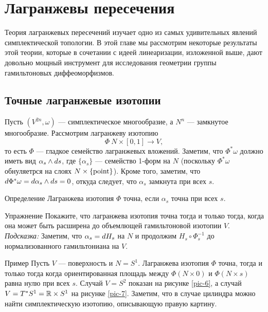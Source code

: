\chapter{Лагранжевы пересечения}\label{chap:6}

Теория лагранжевых пересечений изучает одно из самых удивительных явлений симплектической топологии.
В этой главе мы рассмотрим некоторые результаты этой теории, которые в сочетании с идеей линеаризации, изложенной выше, дают довольно мощный инструмент для исследования геометрии группы гамильтоновых диффеоморфизмов.

\section{Точные лагранжевые изотопии}
Пусть $(V^{2n}, \omega)$ --- симплектическое многообразие, а $N^n$ ---
замкнутое многообразие. 
Рассмотрим лагранжеву изотопию
\[\Phi\: N \times [0, 1] \to V,\]
то есть $\Phi$ --- гладкое семейство лагранжевых вложений.
Заметим, что $\Phi^\ast \omega$ должно иметь вид $\alpha_s \wedge d
s$, где $\{\alpha_s\}$ --- семейство 1-форм на $N$ (поскольку
$\Phi^\ast \omega$ обнуляетрся на слоях $N \times \{\mathrm{point}\}$). 
Кроме того, заметим, что $d \Phi^\ast \omega = d \alpha_s \wedge d
s = 0$, откуда следует, что $\alpha_s$ замкнута при всех $s$. 

\begin{ex*}{Определение}
Лагранжева изотопия $\Phi$ точна, если $\alpha_s$ точна при всех $s$.
\end{ex*}

\begin{ex}{Упражнение}\label{6.1.A}
Покажите, что лагранжева изотопия точна тогда и только тогда, когда
она может быть расширена до объемлющей гамильтоновой изотопии $V$. 
\emph{Подсказка:} Заметим, что $\alpha_s \z= \d  H_s$ на $N$ и продолжим $H_s
\circ \Phi^{-1}_s$ до нормализованного гамильтониана на $V$. 
\end{ex}

\begin{ex*}{Пример}
Пусть $V$ --- поверхность и $N = S^1$.
Лагранжева изотопия $\Phi$ точна, тогда и только тогда когда
ориентированная площадь между $\Phi (N \times {0})$ и $\Phi (N \times
{s})$ равна нулю при всех $s$. 
Случай $V = S^2$ показан на рисунке \ref{pic-6}, а  случай $V = T^\ast S^1 \z= \RR \times S^1$ на рисунке \ref{pic-7}.
Заметим, что в случае цилиндра можно найти симплектическую изотопию, описывающую правую картину.
\end{ex*}


